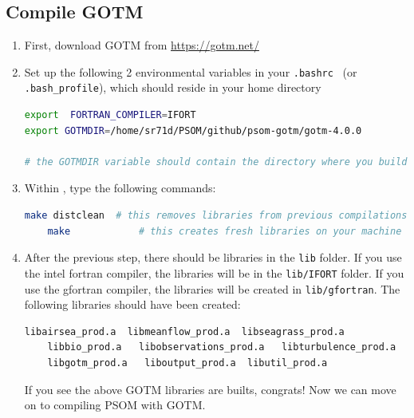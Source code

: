 \documentclass[12pt,letterpaper,titlepage]{article}
\begin{document}
\subsection{Compile GOTM}
\begin{enumerate}
    \item First, download GOTM from \href{https://gotm.net/}{https://gotm.net/}
    \item Set up the following 2 environmental variables in your \texttt{.bashrc} ~(or \texttt{.bash\_profile}), which should reside in your home directory
    
    \begin{lstlisting}[language=sh, breaklines]
export  FORTRAN_COMPILER=IFORT
export GOTMDIR=/home/sr71d/PSOM/github/psom-gotm/gotm-4.0.0

# the GOTMDIR variable should contain the directory where you build gotm
\end{lstlisting}
    
    \item Within , type the following commands:
    
    \begin{lstlisting}[language=sh, breaklines]
    make distclean  # this removes libraries from previous compilations
    make            # this creates fresh libraries on your machine
    \end{lstlisting}

    \item After the previous step, there should be libraries in the \texttt{lib} folder. If you use the intel fortran compiler, the libraries will be in the \texttt{lib/IFORT} folder. If you use the gfortran compiler, the libraries will be created in \texttt{lib/gfortran}. The following libraries should have been created:
    
    \begin{lstlisting}[language=bash, breaklines]
    libairsea_prod.a  libmeanflow_prod.a  libseagrass_prod.a  
    libbio_prod.a   libobservations_prod.a   libturbulence_prod.a   
    libgotm_prod.a   liboutput_prod.a  libutil_prod.a
    \end{lstlisting}

    If you see the above GOTM libraries are builts, congrats! Now we can move on to compiling PSOM with GOTM.
\end{enumerate}
\end{document}
